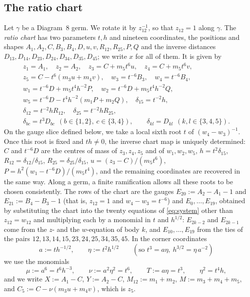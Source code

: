 \documentclass[11pt]{amsart}
\theoremstyle{definition}
\theoremstyle{remark}
\begin{document}
\subsection{The ratio chart}
Let $\gamma$ be a Diagram~8 germ.  We rotate it by $z_{12}^{-1}$, so that $z_{12}=1$ along
$\gamma$.  The \emph{ratio chart} has two parameters $t,h$ and nineteen coordinates, the
positions and shapes $A_1,A_2,C,B_3,B_4,D,u,v,R_{12},R_{25},P,Q$ and the inverse distances
$D_{13},D_{14},D_{23},D_{24},D_{34},D_{35},D_{45}$; we write $x$ for all of them.  It is given by
\begin{gather*}
  z_1=A_1,\quad z_2=A_2,\quad z_3=C+m_5t^6u,\quad z_4=C+m_5t^6v,\\
  z_5=C-t^6(m_3u+m_4v),\quad w_3=t^{-6}B_3,\quad w_4=t^{-6}B_4,\\
  w_1=t^{-6}D+m_5t^4h^{-2}P,\quad w_2=t^{-6}D+m_5t^4h^{-2}Q,\\
  w_5=t^{-6}D-t^4h^{-2}(m_1P+m_2Q),\quad \delta_{15}=t^{-2}h,\\
  \delta_{12}=t^{-2}hR_{12},\quad \delta_{25}=t^{-2}hR_{25},\\
  \delta_{bc}=t^3D_{bc}\ \ (b\in\{1,2\},\ c\in\{3,4\}),\qquad
  \delta_{kl}=D_{kl}\ \ (k,l\in\{3,4,5\}).
\end{gather*}
{On the gauge slice defined below, we take a local sixth root $t$ of
$(w_4-w_3)^{-1}$.  Once this root is fixed and $th\ne0$, the inverse chart map is uniquely
determined: $C$ and $t^{-6}D$ are the centres of mass of $z_3,z_4,z_5$ and of}
$w_1,w_2,w_5$, $h=t^2\delta_{15}$, $R_{12}=\delta_{12}/\delta_{15}$,
$R_{25}=\delta_{25}/\delta_{15}$, $u=(z_3-C)/(m_5t^6)$, $P=h^2(w_1-t^{-6}D)/(m_5t^4)$, and
{the remaining coordinates are recovered in the same way.  Along a germ,
a finite ramification allows all these roots to be chosen consistently.}
The rows of the chart are the gauges $E_{20}:=A_2-A_1-1$ and $E_{21}:=B_4-B_3-1$ (that is,
$z_{12}=1$ and $w_4-w_3=t^{-6}$) and $E_0,\dots,E_{19}$, obtained by substituting the chart into
the twenty equations of \eqref{eq:system} other than $z_{12}=w_{12}$ and multiplying each by a
monomial in $t$ and $h^{1/2}$: $E_{2k-2}$ and $E_{2k-1}$ come from the $z$- and the $w$-equation
of body $k$, and $E_{10},\dots,E_{19}$ from the ties of the pairs
$12,13,14,15,23,24,25,34,35,45$.
In the corner coordinates
\[
  a:=th^{-1/2},\qquad \eta:=t^2h^{1/2}\qquad(\text{so } t^3=a\eta,\ h^{3/2}=\eta\,a^{-2})
\]
we use the monomials
\[
  \mu:=a^6=t^6h^{-3},\qquad \nu:=a^2\eta^2=t^6,\qquad T:=a\eta=t^3,\qquad \eta^2=t^4h,
\]
and we write $X:=A_1-C$, $Y:=A_2-C$, $M_{12}:=m_1+m_2$, $M:=m_3+m_4+m_5$, and
$C_5:=C-\nu(m_3u+m_4v)$, which is $z_5$.
\end{document}
